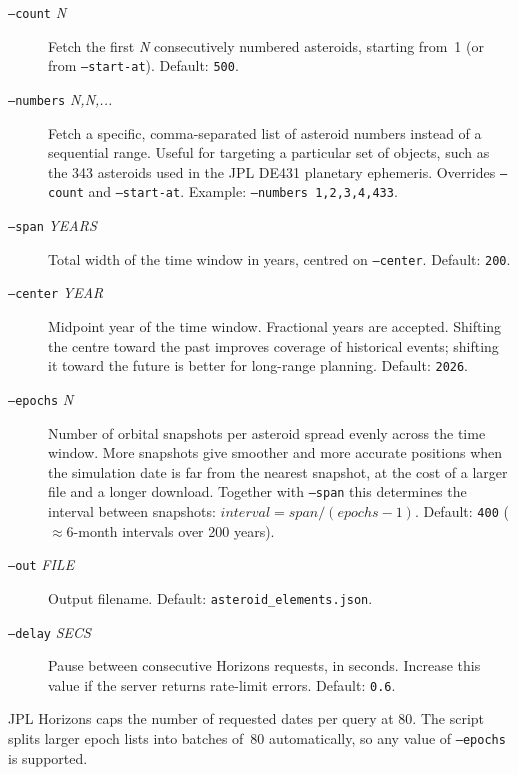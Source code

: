 \begin{description}
\item[\texttt{--count} \textit{N}] Fetch the first \textit{N}
  consecutively numbered asteroids, starting from~1 (or from
  \texttt{--start-at}).  Default: \texttt{500}.
 
\item[\texttt{--numbers} \textit{N,N,...}] Fetch a specific,
  comma-separated list of asteroid numbers instead of a sequential
  range.  Useful for targeting a particular set of objects, such as the
  343 asteroids used in the JPL DE431 planetary ephemeris.  Overrides
  \texttt{--count} and \texttt{--start-at}.  Example:
  \texttt{--numbers 1,2,3,4,433}.
 
\item[\texttt{--span} \textit{YEARS}] Total width of the time window in
  years, centred on \texttt{--center}.  Default: \texttt{200}.
 
\item[\texttt{--center} \textit{YEAR}] Midpoint year of the time
  window.  Fractional years are accepted.  Shifting the centre toward
  the past improves coverage of historical events; shifting it toward
  the future is better for long-range planning.  Default: \texttt{2026}.
 
\item[\texttt{--epochs} \textit{N}] Number of orbital snapshots per
  asteroid spread evenly across the time window.  More snapshots give
  smoother and more accurate positions when the simulation date is far
  from the nearest snapshot, at the cost of a larger file and a longer
  download.  Together with \texttt{--span} this determines the interval
  between snapshots: $\mathit{interval} = \mathit{span} /
  (\mathit{epochs} - 1)$.  Default: \texttt{400}
  (${\approx}$6-month intervals over 200 years).
 
\item[\texttt{--out} \textit{FILE}] Output filename.  Default:
  \texttt{asteroid\_elements.json}.
 
\item[\texttt{--delay} \textit{SECS}] Pause between consecutive
  Horizons requests, in seconds.  Increase this value if the server
  returns rate-limit errors.  Default: \texttt{0.6}.
\end{description}
 
\noindent JPL Horizons caps the number of requested dates per query at
80.  The script splits larger epoch lists into batches of~80
automatically, so any value of \texttt{--epochs} is supported.
 
